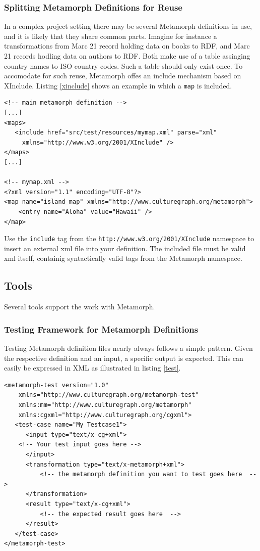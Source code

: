 \documentclass[12pt,a4paper]{article}
\begin{document}
\subsubsection{Splitting Metamorph Definitions for Reuse}

In a complex project setting there may be several Metamorph definitions in use, and it is likely that they share common parts. Imagine for instance a transformations from Marc 21 record holding data on books to RDF, and Marc 21 records hodling data on authors to RDF. Both make use of a table assinging country names to ISO country codes. Such a table should only exist once. To accomodate for such reuse, Metamorph offes an include mechanism based on XInclude. Listing \ref{xinclude} shows an example in which a {\tt map} is included.

\begin{lstlisting}[float=htb, label=xinclude,caption=Including further XML files into a metamorph definition.]
<!-- main metamorph definition -->				
[...]
<maps>
   <include href="src/test/resources/mymap.xml" parse="xml"
	 xmlns="http://www.w3.org/2001/XInclude" />
</maps>
[...]

<!-- mymap.xml -->
<?xml version="1.1" encoding="UTF-8"?>
<map name="island_map" xmlns="http://www.culturegraph.org/metamorph">
	<entry name="Aloha" value="Hawaii" />
</map>
\end{lstlisting}
Use the {\tt include} tag from the {\tt http://www.w3.org/2001/XInclude} namespace to insert an external xml file into your definition. The included file must be valid xml itself, containig syntactically valid tags from the Metamorph namespace.

\subsection{Tools}

Several tools support the work with Metamorph.

\subsubsection{Testing Framework for Metamorph Definitions}

Testing Metamorph definition files nearly always follows a simple pattern. Given the respective definition and an input, a specific output is expected. This can easily be expressed in XML as illustrated in listing \ref{test}.

\begin{lstlisting}[float=htb, label=test,caption=XML test definition]
<metamorph-test version="1.0"
	xmlns="http://www.culturegraph.org/metamorph-test" 
	xmlns:mm="http://www.culturegraph.org/metamorph"
	xmlns:cgxml="http://www.culturegraph.org/cgxml">
   <test-case name="My Testcase1">
      <input type="text/x-cg+xml">
	<!-- Your test input goes here -->           
      </input>
      <transformation type="text/x-metamorph+xml">
          <!-- the metamorph definition you want to test goes here  -->   
      </transformation>
      <result type="text/x-cg+xml">
          <!-- the expected result goes here  -->  
      </result>
   </test-case>
</metamorph-test>
\end{lstlisting}
\end{document}
